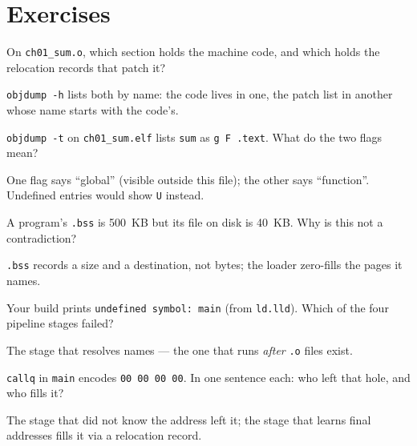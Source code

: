 \section*{Exercises}
\label{sec:exercises01}

\begin{exercise}\label{ex:easy01}
On \texttt{ch01\_sum.o}, which section holds the machine code, and which
holds the relocation records that patch it?
\end{exercise}
\begin{solution}[hint]
\texttt{objdump -h} lists both by name: the code lives in one, the patch
list in another whose name starts with the code's.
\end{solution}

\begin{exercise}\label{ex:easy02}
\texttt{objdump -t} on \texttt{ch01\_sum.elf} lists \texttt{sum} as
\texttt{g F .text}. What do the two flags mean?
\end{exercise}
\begin{solution}[hint]
One flag says ``global'' (visible outside this file); the other says
``function''. Undefined entries would show \texttt{U} instead.
\end{solution}

\begin{exercise}\label{ex:easy03}
A program's \texttt{.bss} is 500~KB but its file on disk is 40~KB.
Why is this not a contradiction?
\end{exercise}
\begin{solution}[hint]
\texttt{.bss} records a size and a destination, not bytes; the loader
zero-fills the pages it names.
\end{solution}

\begin{exercise}\label{ex:easy04}
Your build prints \texttt{undefined symbol: main}
(from \texttt{ld.lld}). Which of the four pipeline stages failed?
\end{exercise}
\begin{solution}[hint]
The stage that resolves names --- the one that runs \emph{after}
\texttt{.o} files exist.
\end{solution}

\begin{exercise}\label{ex:med01}
\texttt{callq} in \texttt{main} encodes \texttt{00 00 00 00}. In one
sentence each: who left that hole, and who fills it?
\end{exercise}
\begin{solution}[hint]
The stage that did not know the address left it; the stage that learns
final addresses fills it via a relocation record.
\end{solution}

